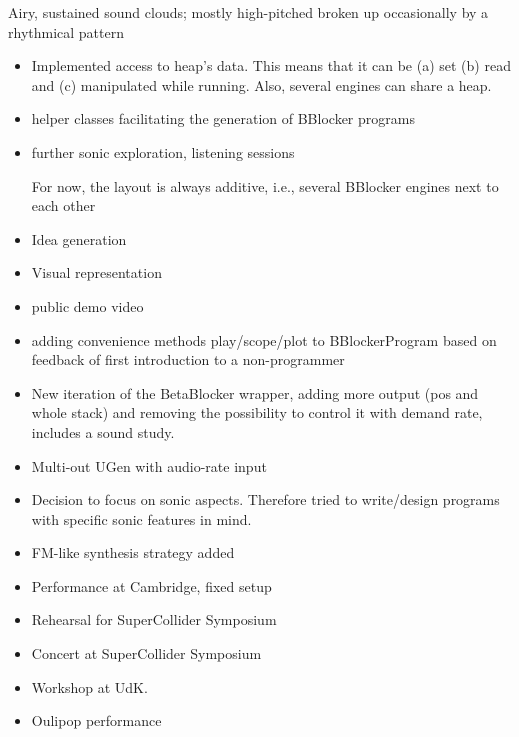 \documentclass[letterpaper, 12pt]{article}
\begin{document}
Airy, sustained sound clouds; mostly high-pitched broken up occasionally by a rhythmical pattern

\begin{itemize}	 
\item Implemented access to heap's data. This means that it can be (a) set (b) read and (c) manipulated while running. Also, several engines can share a heap. 
\item helper classes facilitating the generation of BBlocker programs 
\item further sonic exploration, listening sessions 

	For now, the layout is always additive, i.e., several BBlocker engines next to each other

\item Idea generation
\item Visual representation
\item public demo video
\item adding convenience methods play/scope/plot to BBlockerProgram based on feedback of first introduction to a non-programmer
\item New iteration of the BetaBlocker wrapper, adding more output (pos and whole stack) and removing the possibility to control it with demand rate,
	includes a sound study.
\item Multi-out UGen with audio-rate input
\item Decision to focus on sonic aspects. Therefore tried to write/design programs with specific sonic features in mind.
\item FM-like synthesis strategy added
\item Performance at Cambridge, fixed setup
\item Rehearsal for SuperCollider Symposium
\item Concert at SuperCollider Symposium
\item Workshop at UdK.
\item Oulipop performance
\end{itemize}
\end{document}
